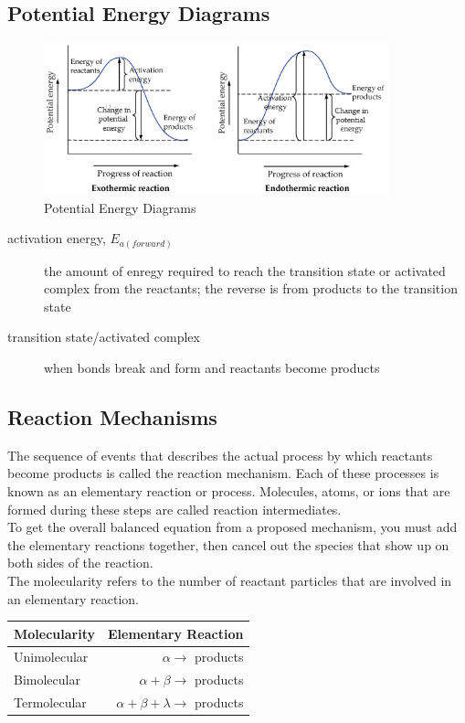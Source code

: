 \documentclass[11pt]{article}
\begin{document}
    \subsection{Potential Energy Diagrams}

    \begin{figure}[h]
        \begin{center}
        \includegraphics[width=10cm]{pe_diagram}
        \caption{Potential Energy Diagrams}
        \end{center}
    \end{figure}

    \begin{description}
        \item[activation energy, $E_{a(forward)}$] the amount of enregy required to reach the transition state or activated complex from the reactants; the reverse is from products to the transition state
        \item[transition state/activated complex] when bonds break and form and reactants become products 
    \end{description}

    \subsection{Reaction Mechanisms}
    The sequence of events that describes the actual process by which reactants become products is called the reaction mechanism. Each of these processes is known as an elementary reaction or process. Molecules, atoms, or ions that are formed during these steps are called reaction intermediates. \\
    \break
    To get the overall balanced equation from a proposed mechanism, you must add the elementary reactions together, then cancel out the species that show up on both sides of the reaction. \\
    \break
    The molecularity refers to the number of reactant particles that are involved in an elementary reaction.
    
    \begin{center}
        \begin{tabular}{| l | r |}
            \hline
            Molecularity & Elementary Reaction \\ \hline
            Unimolecular & $\alpha \rightarrow$ products \\
            Bimolecular & $\alpha + \beta \rightarrow$ products \\
            Termolecular & $\alpha + \beta + \lambda \rightarrow$ products \\ \hline
        \end{tabular}
    \end{center}
\end{document}
